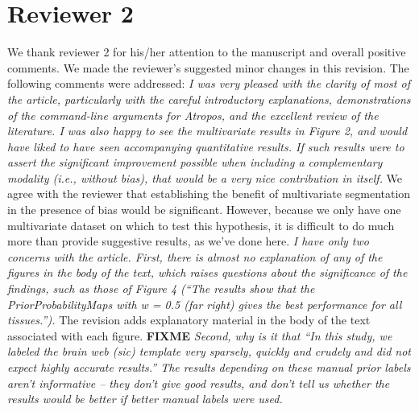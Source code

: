 \documentclass[11pt]{article}
\begin{document}
\section{Reviewer 2}
We thank reviewer 2 for his/her attention to the manuscript and overall 
positive comments.  We made the reviewer's suggested minor changes in this revision.  
The following comments were addressed: 
\newline
\newline
{\em I was very pleased with the clarity of most of the article,
 particularly with the careful introductory explanations,
 demonstrations of the command-line arguments for Atropos, and the
 excellent review of the literature. I was also happy to see the
 multivariate results in Figure 2, and would have liked to have seen
 accompanying quantitative results. If such results were to assert the
 significant improvement possible when including a complementary
 modality (i.e., without bias), that would be a very nice contribution
 in itself.}
\newline
\newline
We agree with the reviewer that establishing the benefit of
multivariate segmentation in the presence of bias would be
significant.  However, because we only have one multivariate dataset
on which to test this hypothesis, it is difficult to do much more than
provide suggestive results, as we've done here.
\newline
\newline
{\em I have only two concerns with the article. First, there is almost
  no explanation of any of the figures in the body of the text, which
  raises questions about the significance of the findings, such as
  those of Figure 4 (``The results show that the PriorProbabilityMaps
  with w = 0.5 (far right) gives the best performance for all
  tissues.''). }
\newline
\newline
The revision adds explanatory material in the body of the text
associated with each figure.  {\bf FIXME}
\newline
\newline
{\em Second, why is it that ``In this study, we labeled the brain web (sic) template very sparsely, quickly and crudely and did not expect highly accurate results.''
The results depending on these manual prior labels aren't informative
-- they don't give good results, and don't tell us whether the results
would be better if better manual labels were used.}
\newline
\newline
\end{document}
